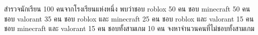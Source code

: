 ﻿%
\question สำรวจนักเรียน 100 คนจากโรงเรียนแห่งหนึ่ง พบว่าชอบ roblox 50 คน ชอบ minecraft 50 คน ชอบ valorant 35 คน ชอบ roblox และ minecraft 25 คน ชอบ roblox และ valorant 15 คน ชอบ minecraft และ valorant 15 คน ชอบทั้งสามเกม 10 คน จงหาจำนวนคนที่ไม่ชอบทั้งสามเกม
\newline
{}
